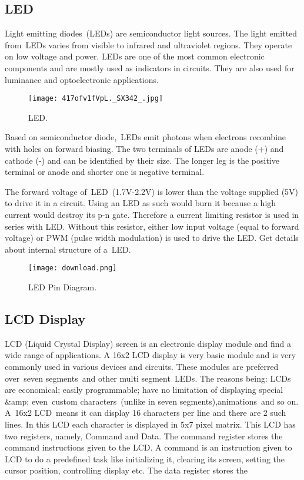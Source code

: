 \subsection{LED}
Light emitting diodes (LEDs) are semiconductor light sources. The light emitted
from LEDs varies from visible to infrared and ultraviolet regions. They operate on low
voltage and power. LEDs are one of the most common electronic components and are
mostly used as indicators in circuits. They are also used for luminance and
optoelectronic applications.\vspace{.3cm}
\begin{figure}[h]
	\centering
	\texttt{[image: 417ofv1fVpL.\_SX342\_.jpg]}
	\caption{LED.}
\end{figure}
Based on semiconductor diode, LEDs emit photons when electrons recombine with
holes on forward biasing. The two terminals of LEDs are anode (+) and cathode (-) and
can be identified by their size. The longer leg is the positive terminal or anode and
shorter one is negative terminal.\vspace{.3cm}


The forward voltage of LED (1.7V-2.2V) is lower than the voltage supplied (5V) to drive
it in a circuit. Using an LED as such would burn it because a high current would destroy
its p-n gate. Therefore a current limiting resistor is used in series with LED. Without this
resistor, either low input voltage (equal to forward voltage) or PWM (pulse width
modulation) is used to drive the LED. Get details about internal structure of a LED.\vspace{.3cm}
\begin{figure}[h]
	\centering
	\texttt{[image: download.png]}
	\caption{LED Pin Diagram.}
\end{figure}





\subsection{LCD Display}
LCD (Liquid Crystal Display) screen is an electronic display module and find a wide
range of applications. A 16x2 LCD display is very basic module and is very commonly
used in various devices and circuits. These modules are preferred over seven
segments and other multi segment LEDs. The reasons being: LCDs are economical;
easily programmable; have no limitation of displaying special \&amp; even custom
characters (unlike in seven segments),animations and so on.
A 16x2 LCD means it can display 16 characters per line and there are 2 such lines. In
this LCD each character is displayed in 5x7 pixel matrix. This LCD has two registers,
namely, Command and Data.
The command register stores the command instructions given to the LCD. A command
is an instruction given to LCD to do a predefined task like initializing it, clearing its
screen, setting the cursor position, controlling display etc. The data register stores the

